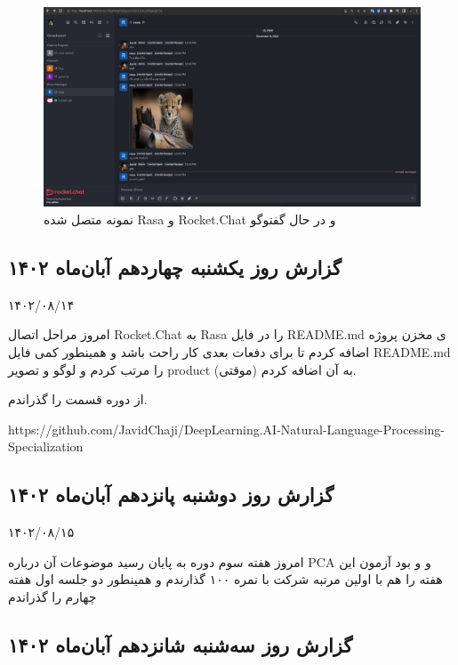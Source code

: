 \begin{figure}[h]
    \includegraphics[width=\linewidth]{Images/Working_Connected_Rocket.Chat_Rasa_Example.png}
    \caption{نمونه متصل شده Rasa و Rocket.Chat و در حال گفتوگو}
\end{figure}



\subsection{گزارش روز یکشنبه چهاردهم آبان‌ماه ۱۴۰۲}

۱۴۰۲/۰۸/۱۴

امروز مراحل اتصال Rocket.Chat به Rasa را در فایل README.md ی مخزن پروژه اضافه کردم تا برای دفعات بعدی کار راحت باشد و همینطور کمی فایل README.md را مرتب کردم و لوگو و تصویر product (موقتی) به آن اضافه کردم.

از دوره  قسمت  را گذراندم.

https://github.com/JavidChaji/DeepLearning.AI-Natural-Language-Processing-Specialization


\subsection{گزارش روز دوشنبه پانزدهم آبان‌ماه ۱۴۰۲}

۱۴۰۲/۰۸/۱۵

امروز هفته سوم دوره  به پایان رسید موضوعات آن درباره PCA و  و  بود آزمون این هفته را هم با اولین مرتبه شرکت با نمره ۱۰۰ گذارندم و همینطور دو جلسه اول هفته چهارم را گذراندم



\subsection{گزارش روز سه‌شنبه شانزدهم آبان‌ماه ۱۴۰۲}


